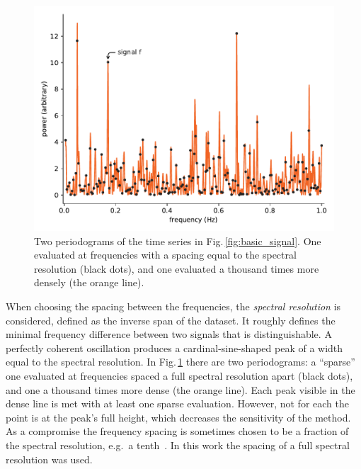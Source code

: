\begin{figure}
  \centering
  \includegraphics[width=\linewidth]{gfx/axions/basic_periodogram.pdf}
  \caption{Two periodograms of the time series in Fig.\,\ref{fig:basic_signal}. One evaluated at frequencies with a spacing equal to the spectral resolution (black dots), and one evaluated a thousand times more densely (the orange line).}\label{fig:basic_periodogram}
\end{figure}

When choosing the spacing between the frequencies, the \emph{spectral resolution} is considered, defined as the inverse span of the dataset.
It roughly defines the minimal frequency difference between two signals that is distinguishable. A perfectly coherent oscillation produces a cardinal-sine-shaped peak of a width equal to the spectral resolution. 
In Fig.\,\ref{fig:basic_periodogram} there are two periodograms: a ``sparse'' one evaluated at frequencies spaced a full spectral resolution apart (black dots), and one a thousand times more dense (the orange line).
Each peak visible in the dense line is met with at least one sparse evaluation. However, not for each the point is at the peak's full height, which decreases the sensitivity of the method. As a compromise the frequency spacing is sometimes chosen to be a fraction of the spectral resolution, e.g.\ a tenth~\cite{Debosscher2007}. In this work the spacing of a full spectral resolution was used.

